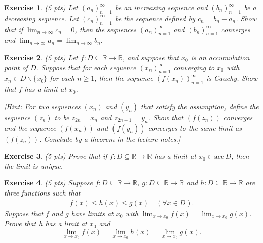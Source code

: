 \documentclass[12pt]{article}
\newcommand{\bR}{\mathbb{R}}
\newcommand{\ra}{\rightarrow}
\theoremstyle{plain}
\newtheorem{exer}{\textbf{Exercise}}}
\theoremstyle{plain}
\begin{document}

\begin{exer}
(5 pts)
Let $(a_n)_{n = 1}^\infty$ be an increasing sequence and $(b_n)_{n = 1}^\infty$ be a decreasing sequence. Let $(c_n)_{n = 1}^\infty$ be the sequence defined by $c_n = b_n - a_n$. Show that if $\lim_{n \ra \infty} c_n = 0$, then the sequences $(a_n)_{n = 1}^\infty$ and $(b_n)_{n = 1}^\infty$ converges and $\lim_{n \ra \infty} a_n = \lim_{n \ra \infty} b_n$.
\end{exer}

\begin{exer}
(5 pts)
Let $f: D \subseteq \bR \ra \bR$, and suppose that $x_0$ is an accumulation point of $D$. Suppose that for each sequence $(x_n)_{n = 1}^\infty$ converging to $x_0$ with $x_n \in D\backslash \{ x_0 \}$ for each $n \geq 1$, then the sequence $(f(x_n))_{n = 1}^\infty$ is Cauchy. Show that $f$ has a limit at $x_0$.

[Hint: For two sequences $(x_n)$ and $(y_n)$ that satisfy the assumption, define the sequence $(z_n)$ to be $z_{2n} = x_n$ and $z_{2n - 1} = y_n$. Show that $(f(z_n))$ converges and the sequence $(f(x_n))$ and $(f(y_n))$ converges to the same limit as $(f(z_n))$. Conclude by a theorem in the lecture notes.]
\end{exer}

\begin{exer}
(5 pts)
Prove that if $f : D \subseteq \bR \ra \bR$ has a limit at $x_0 \in \mathrm{acc}\, D$, then the limit is unique.
\end{exer}

\begin{exer}
(5 pts)
Suppose $f: D \subseteq \bR \ra \bR$, $g: D \subseteq \bR \ra \bR$ and $h : D \subseteq \bR \ra \bR$ are three functions such that
	\begin{align*}
	f(x) \leq h(x) \leq g(x) \quad (\forall x \in D ) .
	\end{align*}
Suppose that $f$ and $g$ have limits at $x_0$ with $\lim_{x \ra x_0} f(x) = \lim_{x \ra x_0} g(x)$. Prove that $h$ has a limit at $x_0$ and
	$$
	\lim_{x \ra x_0} f(x) = \lim_{x \ra x_0} h(x) = \lim_{x \ra x_0} g(x) .
	$$
\end{exer}
\end{document}
